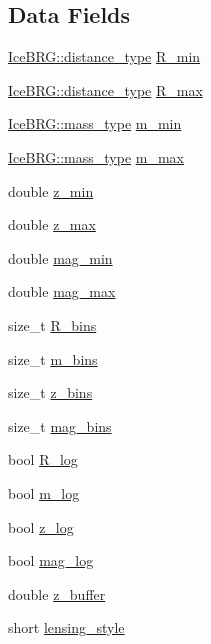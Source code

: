 \subsection*{Data Fields}
\begin{DoxyCompactItemize}
\item 
\hyperlink{namespaceIceBRG_a45499647eb87e24c10ab32c628711cec}{Ice\-B\-R\-G\-::distance\-\_\-type} \hyperlink{structcorr__func__config_a96d6144c4e505099c1cfe7a684bc04fe}{R\-\_\-min}
\item 
\hyperlink{namespaceIceBRG_a45499647eb87e24c10ab32c628711cec}{Ice\-B\-R\-G\-::distance\-\_\-type} \hyperlink{structcorr__func__config_aff81b65fcb8bd33994e15cc6e9f055e6}{R\-\_\-max}
\item 
\hyperlink{namespaceIceBRG_a1be72ac4918a9b029f2eefa084213e35}{Ice\-B\-R\-G\-::mass\-\_\-type} \hyperlink{structcorr__func__config_a1024dce359a71584b457e9336d8b582e}{m\-\_\-min}
\item 
\hyperlink{namespaceIceBRG_a1be72ac4918a9b029f2eefa084213e35}{Ice\-B\-R\-G\-::mass\-\_\-type} \hyperlink{structcorr__func__config_ab08f8d621b4511265b819a1596534310}{m\-\_\-max}
\item 
double \hyperlink{structcorr__func__config_a5ec34a08df3a75740e1c5d39a76a6071}{z\-\_\-min}
\item 
double \hyperlink{structcorr__func__config_aa80df2d7d3aed8c418992ff4648808b6}{z\-\_\-max}
\item 
double \hyperlink{structcorr__func__config_a8ba7b184c01024561a77311ee8cab8f2}{mag\-\_\-min}
\item 
double \hyperlink{structcorr__func__config_a0868149e3bf677097272d0138deda3bb}{mag\-\_\-max}
\item 
size\-\_\-t \hyperlink{structcorr__func__config_af53ff82362ef469976b178d875d0b669}{R\-\_\-bins}
\item 
size\-\_\-t \hyperlink{structcorr__func__config_a0a0f61ffece04838e70e7db635dd214d}{m\-\_\-bins}
\item 
size\-\_\-t \hyperlink{structcorr__func__config_ae9f3db83bee5cac291da7de89bdd6297}{z\-\_\-bins}
\item 
size\-\_\-t \hyperlink{structcorr__func__config_a6bc5de4237d8756c11b86645c6ef66a7}{mag\-\_\-bins}
\item 
bool \hyperlink{structcorr__func__config_a269de7bc2b6288df975786b443001700}{R\-\_\-log}
\item 
bool \hyperlink{structcorr__func__config_a3666c660142e59a9811d5c6dc2cf6da4}{m\-\_\-log}
\item 
bool \hyperlink{structcorr__func__config_a5204dc51747bc18ada4f2c9e26e2ae22}{z\-\_\-log}
\item 
bool \hyperlink{structcorr__func__config_a961d18f857407c0475a0c9ccb5b96455}{mag\-\_\-log}
\item 
double \hyperlink{structcorr__func__config_a17340f8a3eaea4875259c98beb8fec7a}{z\-\_\-buffer}
\item 
short \hyperlink{structcorr__func__config_a8672d6954054bf86f366785aef5a5ea8}{lensing\-\_\-style}
\end{DoxyCompactItemize}
